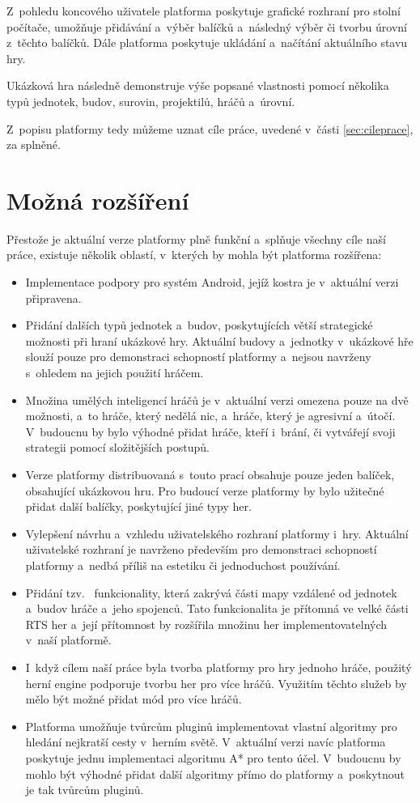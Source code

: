 Z~pohledu koncového uživatele platforma poskytuje grafické rozhraní pro stolní počítače, umožňuje přidávání a~výběr balíčků a~následný výběr či tvorbu úrovní z~těchto balíčků. Dále platforma poskytuje ukládání a~načítání aktuálního stavu hry.

Ukázková hra následně demonstruje výše popsané vlastnosti pomocí několika typů jednotek, budov, surovin, projektilů, hráčů a~úrovní.


Z~popisu platformy tedy můžeme uznat cíle práce, uvedené v~části \ref{sec:cileprace}, za splněné.

\section{Možná rozšíření}
Přestože je aktuální verze platformy plně funkční a~splňuje všechny cíle naší práce, existuje několik oblastí, v~kterých by mohla být platforma rozšířena:

\begin{itemize}
	\item Implementace podpory pro systém Android, jejíž kostra je v~aktuální verzi připravena.
	\item Přidání dalších typů jednotek a~budov, poskytujících větší strategické možnosti při hraní ukázkové hry. Aktuální budovy a~jednotky v~ukázkové hře slouží pouze pro demonstraci schopností platformy a~nejsou navrženy s~ohledem na jejich použití hráčem.
	\item Množina umělých inteligencí hráčů je v~aktuální verzi omezena pouze na dvě možnosti, a~to hráče, který nedělá nic, a~hráče, který je agresivní a~útočí. V~budoucnu by bylo výhodné přidat hráče, kteří i~brání, či vytvářejí svoji strategii pomocí složitějších postupů.
	\item Verze platformy distribuovaná s~touto prací obsahuje pouze jeden balíček, obsahující ukázkovou hru. Pro budoucí verze platformy by bylo užitečné přidat další balíčky, poskytující jiné typy her.
	\item Vylepšení návrhu a~vzhledu uživatelského rozhraní platformy i~hry. Aktuální uživatelské rozhraní je navrženo především pro demonstraci schopností platformy a~nedbá příliš na estetiku či jednoduchost používání. 
	\item Přidání tzv.~ funkcionality, která zakrývá části mapy vzdálené od jednotek a~budov hráče a~jeho spojenců. Tato funkcionalita je přítomná ve velké části RTS her a~její přítomnost by rozšířila množinu her implementovatelných v~naší platformě.
	\item I~když cílem naší práce byla tvorba platformy pro hry jednoho hráče, použitý herní engine podporuje tvorbu her pro více hráčů. Využitím těchto služeb by mělo být možné přidat mód pro více hráčů.
	\item Platforma umožňuje tvůrcům pluginů implementovat vlastní algoritmy pro hledání nejkratší cesty v~herním světě. V~aktuální verzi navíc platforma poskytuje jednu implementaci algoritmu A* pro tento účel. V~budoucnu by mohlo být výhodné přidat další algoritmy přímo do platformy a~poskytnout je tak tvůrcům pluginů.
	
\end{itemize}
